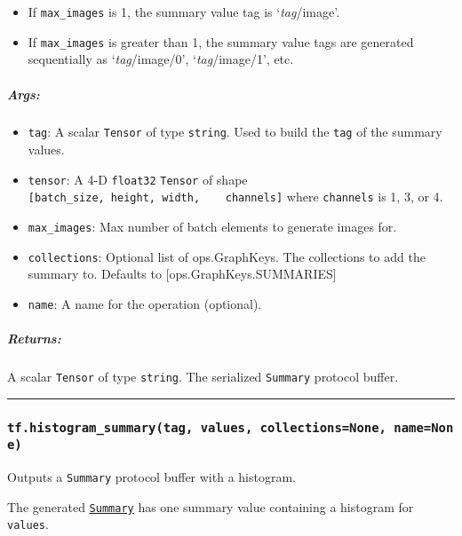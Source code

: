 \begin{itemize}
\tightlist
\item
  If \texttt{max\_images} is 1, the summary value tag is
  `\emph{tag}/image'.
\item
  If \texttt{max\_images} is greater than 1, the summary value tags are
  generated sequentially as `\emph{tag}/image/0', `\emph{tag}/image/1',
  etc.
\end{itemize}

\subparagraph{Args: }\label{args-31}

\begin{itemize}
\tightlist
\item
  \texttt{tag}: A scalar \texttt{Tensor} of type \texttt{string}. Used
  to build the \texttt{tag} of the summary values.
\item
  \texttt{tensor}: A 4-D \texttt{float32} \texttt{Tensor} of shape
  \texttt{{[}batch\_size,\ height,\ width,\ \ \ \ channels{]}} where
  \texttt{channels} is 1, 3, or 4.
\item
  \texttt{max\_images}: Max number of batch elements to generate images
  for.
\item
  \texttt{collections}: Optional list of ops.GraphKeys. The collections
  to add the summary to. Defaults to {[}ops.GraphKeys.SUMMARIES{]}
\item
  \texttt{name}: A name for the operation (optional).
\end{itemize}

\subparagraph{Returns: }\label{returns-22}

A scalar \texttt{Tensor} of type \texttt{string}. The serialized
\texttt{Summary} protocol buffer.

\begin{center}\rule{0.5\linewidth}{\linethickness}\end{center}

\subsubsection{\texorpdfstring{\texttt{tf.histogram\_summary(tag,\ values,\ collections=None,\ name=None)}
}{tf.histogram\_summary(tag, values, collections=None, name=None) }}\label{tf.histogramux5fsummarytag-values-collectionsnone-namenone}

Outputs a \texttt{Summary} protocol buffer with a histogram.

The generated
\href{https://tensorflow.googlesource.com/tensorflow/+/master/tensorflow/core/framework/summary.proto}{\texttt{Summary}}
has one summary value containing a histogram for \texttt{values}.

